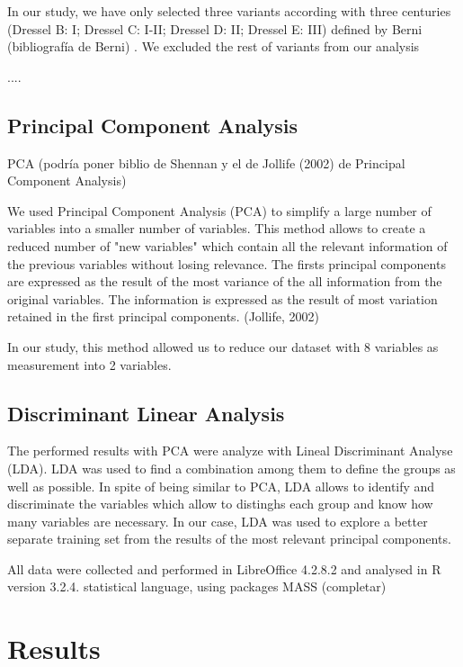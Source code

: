 \documentclass[review, twocolumn]{elsarticle}
\begin{document}
In our study, we have only selected three variants according with three centuries (Dressel B: I; Dressel C: I-II; Dressel D: II; Dressel E: III) defined by Berni (bibliografía de Berni) . We excluded the rest of variants from our analysis 




....

\subsection{Principal Component Analysis}

PCA (podría poner biblio de Shennan y el de Jollife (2002) de Principal Component Analysis)

We used Principal Component Analysis (PCA) to simplify a large number of variables into a smaller number of variables. This method allows to create a reduced number of "new variables" which contain all the relevant information of the previous variables without losing relevance. The firsts principal components are expressed as the result of the most variance of the all information from the original variables.  
The information is expressed as the result of most variation retained in the first principal components. (Jollife, 2002)
  

In our study, this method allowed us to reduce our dataset with 8 variables as measurement into 2 variables. 

\subsection{Discriminant Linear Analysis} 


The performed results with PCA were analyze with Lineal Discriminant Analyse (LDA). LDA was used to find a combination among them to define the groups as well as possible. In spite of being similar to PCA, LDA allows to identify and discriminate the variables which allow to distinghs each group and know how many variables are necessary. In our case, LDA was used to explore a better separate training set from the results of the most relevant principal components. 

All data were collected and performed in LibreOffice 4.2.8.2 and analysed in R version 3.2.4. statistical language, using packages MASS (completar)


\section{Results}
\end{document}
